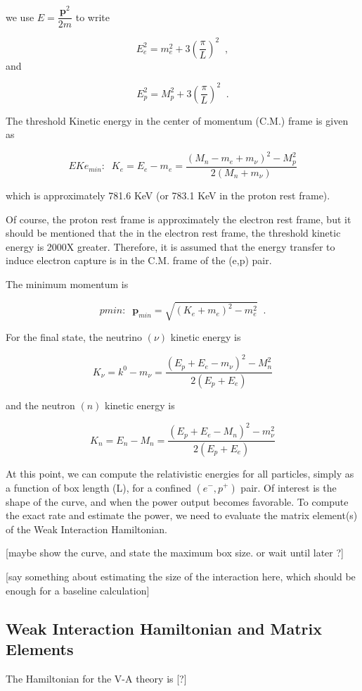 \documentclass[11pt]{amsart}
\begin{document}
we use $E=\dfrac{\mathbf{p}^{2}}{2m}$ to write

$$E^{2}_{e}=m^{2}_{e}+3\left(\dfrac{\pi}{L}\right)^{2}\;\;,$$ and

$$E^{2}_{p}=M^{2}_{p}+3\left(\dfrac{\pi}{L}\right)^{2}\;\;.$$

The threshold Kinetic energy in the center of momentum (C.M.) frame is given as

$$EKe_{min}:\;\;K_{e}=E_{e}-m_{e}=\dfrac{(M_{n}-m_{e}+m_{\nu})^{2}-M^{2}_{p}}{2(M_{n}+m_{\nu})}$$

which is approximately 781.6 KeV (or 783.1 KeV in the proton rest frame).

Of course, the proton rest frame is approximately the electron rest frame, but it should be mentioned that the in the electron rest frame, the threshold kinetic energy is 2000X greater.  Therefore, it is assumed that the energy transfer to induce electron capture is in the C.M. frame of the (e,p) pair.
 
The minimum momentum is 

$$pmin:\;\;\mathbf{p}_{min}=\sqrt{(K_{e}+m_{e})^{2}-m_{e}^{2}}\;\;.$$

For the final state, the neutrino $(\nu)$ kinetic energy is

$$K_{\nu}=k^{0}-m_{\nu}=\dfrac{(E_{p}+E_{e}-m_{\nu})^{2}-M^{2}_{n}}{2(E_{p}+E_{e})}$$

and the neutron $(n)$ kinetic energy is

$$K_{n}=E_{n}-M_{n}=\dfrac{(E_{p}+E_{e}-M_{n})^{2}-m^{2}_{\nu}}{2(E_{p}+E_{e})}$$

At this point, we can compute the relativistic energies for all particles, simply as a function of box length (L), for a confined $(e^{-},p^{+})$ pair.  Of interest is the shape of the curve, and when the power output becomes favorable.  To compute the exact rate and estimate the power, we need to evaluate the matrix element(s) of the Weak Interaction Hamiltonian.  

[maybe show the curve, and state the maximum box size. or wait until later ?]  

[say something about estimating the size of the interaction here, which should be enough for a baseline calculation]


\subsection{Weak Interaction Hamiltonian and Matrix Elements}

The Hamiltonian for the V-A theory is [?]
\end{document}
